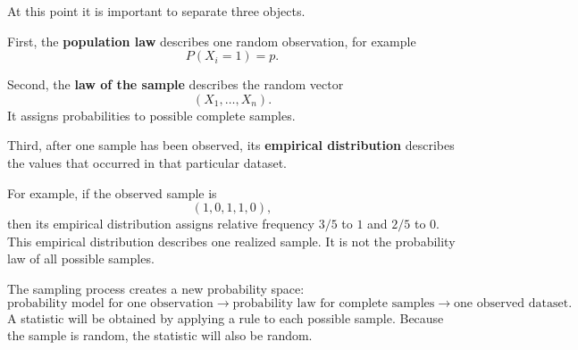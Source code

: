 At this point it is important to separate three objects.

First, the \textbf{population law} describes one random observation, for example
\[
P(X_i=1)=p.
\]

Second, the \textbf{law of the sample} describes the random vector
\[
(X_1,\ldots,X_n).
\]
It assigns probabilities to possible complete samples.

Third, after one sample has been observed, its \textbf{empirical distribution}
describes the values that occurred in that particular dataset.

For example, if the observed sample is
\[
(1,0,1,1,0),
\]
then its empirical distribution assigns relative frequency \(3/5\) to \(1\) and
\(2/5\) to \(0\). This empirical distribution describes one realized sample. It
is not the probability law of all possible samples.

\begin{summarybox}
The sampling process creates a new probability space:
\[
\text{probability model for one observation}
\longrightarrow
\text{probability law for complete samples}
\longrightarrow
\text{one observed dataset}.
\]
A statistic will be obtained by applying a rule to each possible sample. Because
the sample is random, the statistic will also be random.
\end{summarybox}
